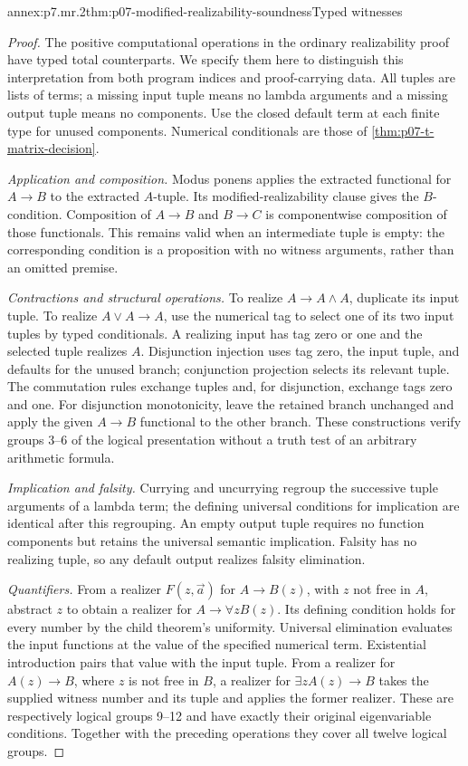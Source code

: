 \begin{annexitem}{annex:p7.mr.2}{thm:p07-modified-realizability-soundness}{Typed witnesses}
\begin{proof}
The positive computational operations in the ordinary realizability
proof have typed total counterparts. We specify them here to distinguish
this interpretation from both program indices and proof-carrying data.
All tuples are lists of terms; a missing input tuple means no lambda
arguments and a missing output tuple means no components. Use the closed
default term at each finite type for unused components. Numerical
conditionals are those of \cref{thm:p07-t-matrix-decision}.

\emph{Application and composition.} Modus ponens applies the extracted
functional for \(A\to B\) to the extracted \(A\)-tuple. Its
modified-realizability clause gives the \(B\)-condition. Composition
of \(A\to B\) and \(B\to C\) is componentwise composition of
those functionals. This remains valid when an intermediate tuple is
empty: the corresponding condition is a proposition with no witness
arguments, rather than an omitted premise.

\emph{Contractions and structural operations.} To realize
\(A\to A\land A\), duplicate its input tuple. To realize
\(A\lor A\to A\), use the numerical tag to select one of its
two input tuples by typed conditionals. A realizing input has tag zero
or one and the selected tuple realizes \(A\). Disjunction injection
uses tag zero, the input tuple, and defaults for the unused branch;
conjunction projection selects its relevant tuple. The commutation
rules exchange tuples and, for disjunction, exchange tags zero and one.
For disjunction monotonicity, leave the retained branch unchanged and
apply the given \(A\to B\) functional to the other branch. These
constructions verify groups 3--6 of the logical presentation without a
truth test of an arbitrary arithmetic formula.

\emph{Implication and falsity.} Currying and uncurrying regroup the
successive tuple arguments of a lambda term; the defining universal
conditions for implication are identical after this regrouping. An
empty output tuple requires no function components but retains the
universal semantic implication. Falsity has no realizing tuple, so
any default output realizes falsity elimination.

\emph{Quantifiers.} From a realizer \(F(z,\vec a)\) for
\(A\to B(z)\), with \(z\) not free in \(A\), abstract \(z\)
to obtain a realizer for \(A\to\forall zB(z)\). Its defining
condition holds for every number by the child theorem's uniformity.
Universal elimination evaluates the input functions at the value of
the specified numerical term. Existential introduction pairs that
value with the input tuple. From a realizer for \(A(z)\to B\),
where \(z\) is not free in \(B\), a realizer for
\(\exists zA(z)\to B\) takes the supplied witness number and
its tuple and applies the former realizer. These are respectively
logical groups 9--12 and have exactly their original eigenvariable
conditions. Together with the preceding operations they cover all
twelve logical groups.


\end{proof}
\end{annexitem}
